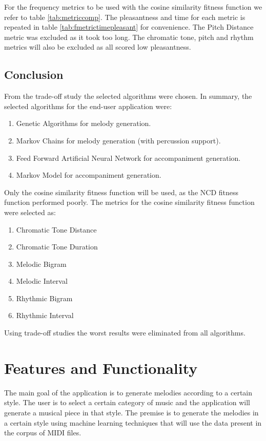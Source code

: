 For the frequency metrics to be used with the cosine similarity fitness function we refer to table \ref{tab:metriccomp}. The pleasantness and time for each metric is repeated in table \ref{tab:fmetrictimepleasant} for convenience. The Pitch Distance metric was excluded as it took too long. The chromatic tone, pitch and rhythm metrics will also be excluded as all scored low pleasantness. 


\section{Conclusion}
From the trade-off study the selected algorithms were chosen.
In summary, the selected algorithms for the end-user application were:
\begin{enumerate}
\item Genetic Algorithms for melody generation.
\item Markov Chains for melody generation (with percussion support).
\item Feed Forward Artificial Neural Network for accompaniment generation.
\item Markov Model for accompaniment generation.
\end{enumerate}

Only the cosine similarity fitness function will be used, as the \ac{NCD} fitness function performed poorly. The metrics for the cosine similarity fitness function were selected as:
\begin{enumerate}
\item Chromatic Tone Distance
\item Chromatic Tone Duration
\item Melodic Bigram
\item Melodic Interval
\item Rhythmic Bigram
\item Rhythmic Interval
\end{enumerate}

Using trade-off studies the worst results were eliminated from all algorithms.

\chapter{Features and Functionality}
The main goal of the application is to generate melodies according to a certain style. The user is to select a certain category of music and the application will generate a musical piece in that style. The premise is to generate the melodies in a certain style using machine learning techniques that will use the data present in the corpus of MIDI files. 

